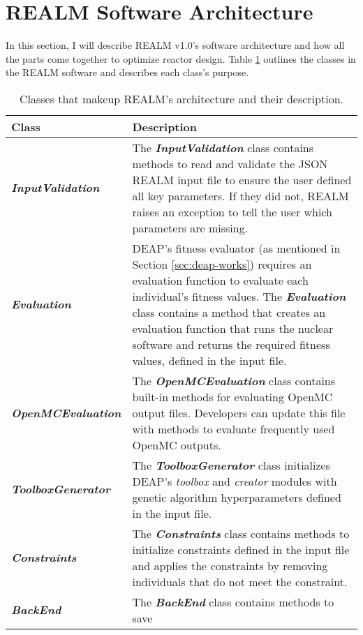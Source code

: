 \section{REALM Software Architecture}
In this section, I will describe \gls{REALM} v1.0's software architecture and 
how all the parts come together to optimize reactor design. 
Table \ref{tab:realm-architecture} outlines the classes in the \gls{REALM} software 
and describes each class's purpose.
\begin{table}[]
    \centering
    \onehalfspacing
    \caption{Classes that makeup \gls{REALM}'s architecture and their description. }
	\label{tab:realm-architecture}
    \footnotesize
    \begin{tabular}{l|p{}}
    \hline
    \textbf{Class} & \textbf{Description} \\ \hline
    \textbf{\textit{InputValidation}} & The \textbf{\textit{InputValidation}} class contains methods 
    to read and validate the JSON \gls{REALM} input file to 
    ensure the user defined all key parameters. If they did not, \gls{REALM} 
    raises an exception to tell the user which parameters are missing. \\
    \hline
    \textbf{\textit{Evaluation}} & \gls{DEAP}'s fitness evaluator (as mentioned in Section 
    \ref{sec:deap-works}) requires an evaluation function to evaluate each 
    individual's fitness values. 
    The \textbf{\textit{Evaluation}} class contains a method that creates an evaluation 
    function that runs the nuclear software and returns the required fitness values, 
    defined in the input file. \\
    \hline 
    \textbf{\textit{OpenMCEvaluation}} & The \textbf{\textit{OpenMCEvaluation}} class contains
    built-in methods for evaluating OpenMC output files. Developers can update 
    this file with methods to evaluate frequently used OpenMC outputs. \\
    \hline 
    \textbf{\textit{ToolboxGenerator}} & The \textbf{\textit{ToolboxGenerator}} class initializes
    \gls{DEAP}'s \textit{toolbox} and \textit{creator} modules with genetic algorithm 
    hyperparameters defined in the input file.\\
    \hline
    \textbf{\textit{Constraints}} & The \textbf{\textit{Constraints}} class 
    contains methods to initialize constraints defined in the input file 
    and applies the constraints by removing individuals that do not meet the 
    constraint.\\
    \hline 
    \textbf{\textit{BackEnd}} & The \textbf{\textit{BackEnd}} class contains methods to save 

\end{tabular}
\end{table}
